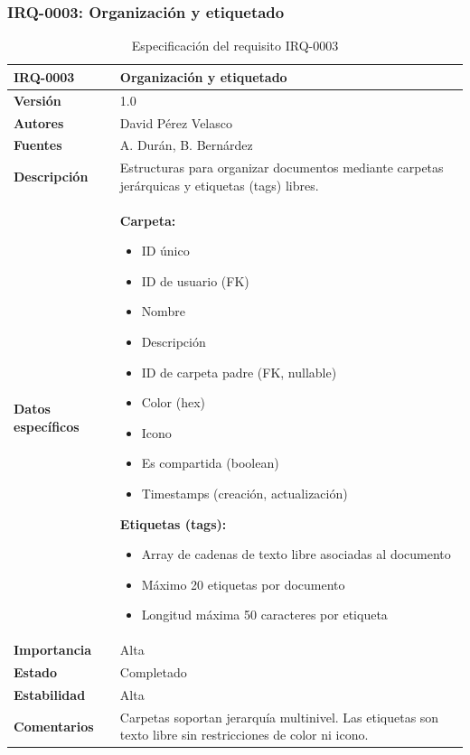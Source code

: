\documentclass[11pt, a4paper]{article}
\begin{document}
\subsubsection{IRQ-0003: Organización y etiquetado}

\begin{table}[H]
    \centering
    \small
    \begin{tabular}{|p{4cm}|p{10cm}|}
    \hline
    \textbf{IRQ-0003} & Organización y etiquetado \\
    \hline
    \textbf{Versión} & 1.0 \\
    \hline
    \textbf{Autores} & David Pérez Velasco \\
    \hline
    \textbf{Fuentes} & A. Durán, B. Bernárdez \\
    \hline
    \textbf{Descripción} & Estructuras para organizar documentos mediante carpetas jerárquicas y etiquetas (tags) libres. \\
    \hline
    \textbf{Datos específicos} & 
    \textbf{Carpeta:}
    \begin{itemize}
        \item ID único
        \item ID de usuario (FK)
        \item Nombre
        \item Descripción
        \item ID de carpeta padre (FK, nullable)
        \item Color (hex)
        \item Icono
        \item Es compartida (boolean)
        \item Timestamps (creación, actualización)
    \end{itemize}
    
    \textbf{Etiquetas (tags):}
    \begin{itemize}
        \item Array de cadenas de texto libre asociadas al documento
        \item Máximo 20 etiquetas por documento
        \item Longitud máxima 50 caracteres por etiqueta
    \end{itemize} \\
    \hline
    \textbf{Importancia} & Alta \\
    \hline
    \textbf{Estado} & Completado \\
    \hline
    \textbf{Estabilidad} & Alta \\
    \hline
    \textbf{Comentarios} & Carpetas soportan jerarquía multinivel. Las etiquetas son texto libre sin restricciones de color ni icono. \\
    \hline
    \end{tabular}
    \caption{Especificación del requisito IRQ-0003}
\end{table}
\end{document}
